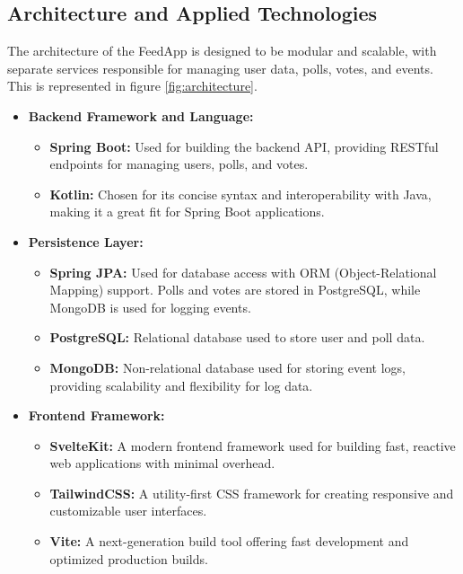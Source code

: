 \subsection{Architecture and Applied Technologies}
The architecture of the FeedApp is designed to be modular and scalable, with separate services responsible for managing user data, polls, votes, and events. This is represented in figure \ref{fig:architecture}. 
\begin{itemize}
    \item \textbf{Backend Framework and Language:} 
    \begin{itemize}
        \item \textbf{Spring Boot:} Used for building the backend API, providing RESTful endpoints for managing users, polls, and votes.
        \item \textbf{Kotlin:} Chosen for its concise syntax and interoperability with Java, making it a great fit for Spring Boot applications.
    \end{itemize}
    
    \item \textbf{Persistence Layer:} 
    \begin{itemize}
        \item \textbf{Spring JPA:} Used for database access with ORM (Object-Relational Mapping) support. Polls and votes are stored in PostgreSQL, while MongoDB is used for logging events.
        \item \textbf{PostgreSQL:} Relational database used to store user and poll data.
        \item \textbf{MongoDB:} Non-relational database used for storing event logs, providing scalability and flexibility for log data.
    \end{itemize}
    
    \item \textbf{Frontend Framework:} 
    \begin{itemize}
        \item \textbf{SvelteKit:} A modern frontend framework used for building fast, reactive web applications with minimal overhead.
        \item \textbf{TailwindCSS:} A utility-first CSS framework for creating responsive and customizable user interfaces.
        \item \textbf{Vite:} A next-generation build tool offering fast development and optimized production builds.
    \end{itemize}
    

\end{itemize}
